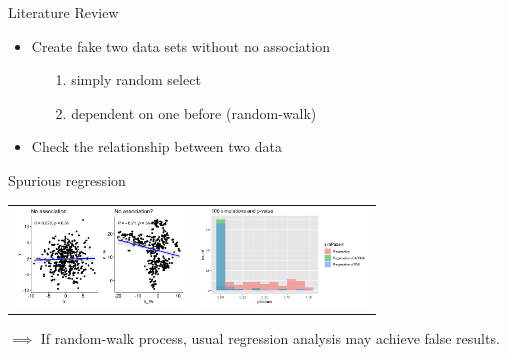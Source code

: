 \documentclass{beamer}
\begin{document}
\begin{frame}{Literature Review}
    \begin{itemize}
        \item Create fake two data sets without no association
        \begin{enumerate}
            \item[1.] simply random select
            \item[2.] dependent on one before (random-walk)
        \end{enumerate}
        \item Check the relationship between two data
    \end{itemize}
    \begin{block}{Spurious regression}
    \centering
        \begin{tabular}{cc}
            \includegraphics[width=4.5cm]{spuriousRegression.png}
                    &
            \includegraphics[width=4.5cm]{100pvalues.png}\\
        \end{tabular}
    \end{block}
    $\implies$ If random-walk process, usual regression analysis may achieve false results.
\end{frame}
\end{document}
